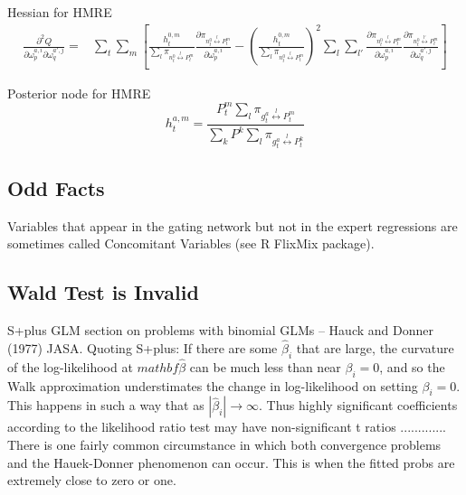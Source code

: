 \documentclass[12pt]{article}
\newcommand{\sumgateprod}[3]{\pi_{#1 \overset{#3}{\longleftrightarrow} #2}}
\newcommand{\shortsum}[1]{\sum \nolimits_{#1}}
\begin{document}
Hessian for HMRE
\begin{equation}
  \begin{split}
    \frac{\partial^{2} Q}{\partial \omega^{a,i}_{p} \partial \omega^{a',j}_{q}} =& \sum_{t} \sum_{m} \left[  \frac{h^{0,m}_{t}}{\sum_{l} \pi_{n^{0}_{t} \overset{l}{\longleftrightarrow} P^{m}_{t}}} \frac{\partial \pi_{n^{0}_{t} \overset{l}{\longleftrightarrow} P^{m}_{t}}}{\partial \omega^{a,i}_{p}} - \left( \frac{h^{0,m}_{t}}{\sum_{l} \pi_{n^{0}_{t} \overset{l}{\longleftrightarrow} P^{m}_{t}}} \right)^{2} \sum_{l} \sum_{l'} \frac{\partial \pi_{n^{0}_{t} \overset{l}{\longleftrightarrow} P^{m}_{t}}}{\partial \omega^{a,i}_{p}}  \frac{\partial \pi_{n^{0}_{t} \overset{l'}{\longleftrightarrow} P^{m}_{t}}}{\partial \omega^{a',j}_{q}} \right]
  \end{split}
\end{equation}


Posterior node for HMRE
\begin{equation} 
  h^{a,m}_{t} = \frac{P^{m}_{t} \shortsum{l} \sumgateprod{g^{a}_{t}}{P^{m}_{t}}{l}}{\sum_{k} P^{k} \shortsum{l} \sumgateprod{g^{a}_{t}}{P^{k}_{t}}{l}}
\end{equation}



\subsection{Odd Facts}

Variables that appear in the gating network but not in the expert regressions
are sometimes called Concomitant Variables (see R FlixMix package).




\subsection{Wald Test is Invalid}
S+plus GLM section on problems with binomial GLMs
  -- Hauck and Donner (1977) JASA. Quoting S+plus: If there are
  some $\hat{\beta}_{i}$ that are large, the curvature of the log-likelihood at
  $mathbf{\hat{\beta}}$ can be much less than near $\beta_{i}=0$, and so the Walk
  approximation understimates the change in log-likelihood on setting $\beta_{i}=0$.
  This happens in such a way that as $|\hat{\beta}_{i}| \rightarrow \infty$. Thus
  highly significant coefficients according to the likelihood ratio test may have
  non-significant t ratios ............. There is one fairly common circumstance
  in which both convergence problems and the Hauek-Donner phenomenon can occur.
  This is when the fitted probs are extremely close to zero or one.
\end{document}

